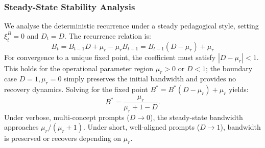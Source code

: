 \documentclass[11pt,a4paper]{report}
\begin{document}
\subsubsection{Steady-State Stability Analysis}
We analyse the deterministic recurrence under a steady pedagogical style, setting $\xi_t^B=0$ and $D_t=D$. The recurrence relation is:
\begin{equation}
    B_t = B_{t-1} D + \mu_r - \mu_r B_{t-1} = B_{t-1}(D - \mu_r) + \mu_r
\end{equation}
For convergence to a unique fixed point, the coefficient must satisfy $|D-\mu_r|<1$. This holds for the operational parameter region $\mu_r>0$ or $D<1$; the boundary case $D=1,\mu_r=0$ simply preserves the initial bandwidth and provides no recovery dynamics. Solving for the fixed point $B^*=B^*(D-\mu_r)+\mu_r$ yields:
\begin{equation}
    B^* = \frac{\mu_r}{\mu_r + 1 - D}.
\end{equation}
Under verbose, multi-concept prompts ($D\to0$), the steady-state bandwidth approaches $\mu_r/(\mu_r+1)$. Under short, well-aligned prompts ($D\to1$), bandwidth is preserved or recovers depending on $\mu_r$.
\end{document}
